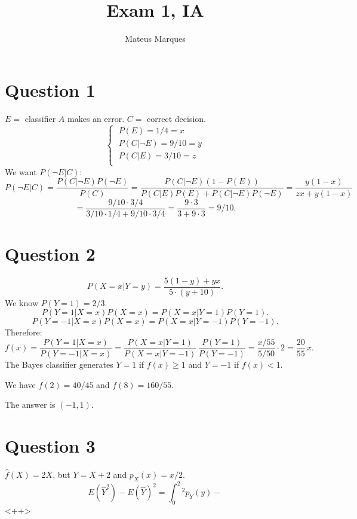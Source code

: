 \documentclass[a4paper,fleqn,12pt]{article}
\title{\Huge{\textbf{Exam 1, IA}}}
\author{Mateus Marques}
\begin{document}
\maketitle

\section{Question 1}
$E =$ classifier $A$ makes an error. $C =$ correct decision.
$$
\begin{cases}
\; P(E) = 1/4 = x \\
\; P(C | \neg E) = 9/10 = y \\
\; P(C | E) = 3/10 = z \\
\end{cases}
$$
We want $P(\neg E| C)$:
$$
P(\neg E | C) = \frac{P(C | \neg E) P(\neg E)}{P(C)} =
\frac{P(C|\neg E) (1-P(E))}{P(C|E) P(E) + P(C|\neg E) P(\neg E)} =
\frac{y (1-x)}{z x + y (1-x)}
$$
$$
= \frac{9/10 \cdot 3/4}{3/10 \cdot 1/4 + 9/10 \cdot 3/4} =
\frac{9 \cdot 3}{3 + 9 \cdot 3} = 9/10.
$$

\section{Question 2}

$$
P(X = x | Y = y) = \frac{5(1-y) + yx}{5 \cdot (y + 10)}.
$$
We know $P(Y=1) = 2/3$.
$$
P(Y = 1 | X = x) P(X = x) = P(X = x | Y=1) P(Y = 1).
$$
$$
P(Y = -1 | X = x) P(X = x) = P(X = x | Y=-1) P(Y = -1).
$$
Therefore:
$$
f(x) = \frac{P(Y=1|X=x)}{P(Y=-1|X=x)} = \frac{P(X=x|Y=1)}{P(X=x|Y=-1)} \, \frac{P(Y=1)}{P(Y=-1)} =
\frac{x/55}{5/50} \cdot 2 = \frac{20}{55} \, x.
$$
The Bayes classifier generates $Y = 1$ if $f(x) \geq 1$ and $Y = -1$ if $f(x) < 1$.

We have $f(2) = 40/45$ and $f(8) = 160/55$.

\n

The answer is $(-1, 1)$.

\section{Question 3}

$\hat{f}(X) = 2X$, but $Y = X+2$ and $p_X(x) = x/2$.
$$
E(\hat{Y}^2) - E(\hat{Y})^2 = \int_0^2 ^2 p_Y(y) -
$$
<++>
\end{document}
